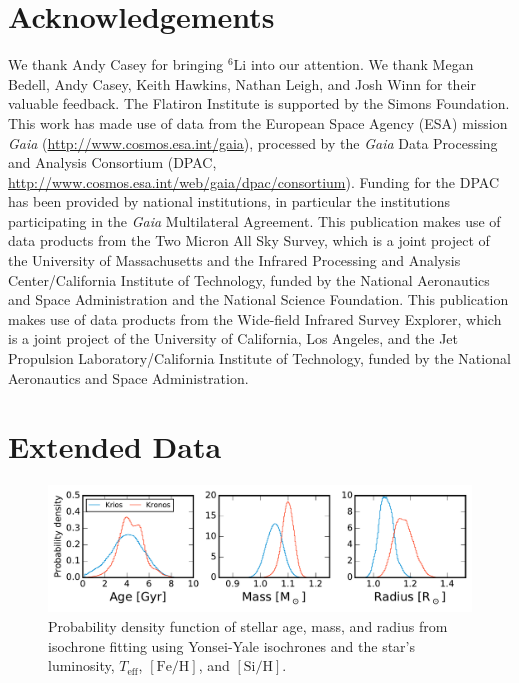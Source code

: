 \documentclass[12pt,letterpaper,margin=1in]{article}
\newcommand*\elem[1]{\ensuremath{\mathrm{#1}}}
\newcommand*\elemH[1]{\ensuremath{[\mathrm{#1}/\elem{H}]}}
\newcommand*\teff{\ensuremath{T_\mathrm{eff}}}
\newcommand*{\feh}{\ensuremath{\elemH{Fe}}}
\begin{document}
\section{Acknowledgements}
We thank Andy Casey for bringing $^{6}\elem{Li}$ into our attention.
We thank Megan Bedell, Andy Casey, Keith Hawkins, Nathan Leigh, and Josh Winn
for their valuable feedback.
The Flatiron Institute is supported by the Simons Foundation.
This work has made use of data from the European Space Agency (ESA) mission
{\it Gaia} (\url{http://www.cosmos.esa.int/gaia}), processed by the {\it Gaia}
Data Processing and Analysis Consortium (DPAC,
\url{http://www.cosmos.esa.int/web/gaia/dpac/consortium}). Funding for the DPAC
has been provided by national institutions, in particular the institutions
participating in the {\it Gaia} Multilateral Agreement.
This publication makes use of data products from the Two Micron All Sky Survey,
which is a joint project of the University of Massachusetts and the Infrared
Processing and Analysis Center/California Institute of Technology, funded by
the National Aeronautics and Space Administration and the National Science
Foundation.
This publication makes use of data products from the Wide-field Infrared Survey
Explorer, which is a joint project of the University of California, Los
Angeles, and the Jet Propulsion Laboratory/California Institute of Technology,
funded by the National Aeronautics and Space Administration.


\section{Extended Data}

\begin{figure}[htpb]
  \centering
  \includegraphics[width=0.95\linewidth]{yyisofitting.pdf}
  \caption{Probability density function of stellar age, mass, and radius
    from isochrone fitting using Yonsei-Yale isochrones\cite{2013ApJ...776...87S}
    and the star's luminosity, \teff, \feh, and \elemH{Si}.
  }
  \label{fig:yyisofitting}
\end{figure}
\end{document}
